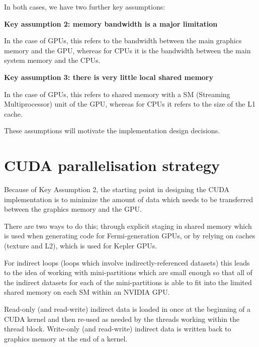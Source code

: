 \documentclass[11pt]{article}
\begin{document}
In both cases, we have two further key assumptions:

\vspace{0.1in}
{\bf Key assumption 2: memory bandwidth is a major limitation}
\vspace{0.1in}

In the case of GPUs, this refers to the bandwidth between the main
graphics memory and the GPU, whereas for CPUs it is the bandwidth between
the main system memory and the CPUs.

\vspace{0.1in}
{\bf Key assumption 3: there is very little local shared memory}
\vspace{0.1in}

In the case of GPUs, this refers to shared memory with a SM
(Streaming Multiprocessor) unit of the GPU, whereas for CPUs it
refers to the size of the L1 cache.


These assumptions will motivate the implementation design decisions.




\newpage

\section{CUDA parallelisation strategy}

Because of Key Assumption 2, the starting point in designing the
CUDA implementation is to minimize the amount of data which needs
to be transferred between the graphics memory and the GPU.

There are two ways to do this; through explicit staging in shared memory
which is used when generating code for Fermi-generation GPUs, or by
relying on caches (texture and L2), which is used for Kepler GPUs.

For indirect loops (loops which involve indirectly-referenced datasets)
this leads to the idea of working with mini-partitions which are small
enough so that all of the indirect datasets for each of the mini-partitions
is able to fit into the limited shared memory on each SM within an NVIDIA
GPU.

Read-only (and read-write) indirect data is loaded in once at the beginning
of a CUDA kernel and then re-used as needed by the threads working within
the thread block.  Write-only (and read-write) indirect data is written
back to graphics memory at the end of a kernel.
\end{document}
